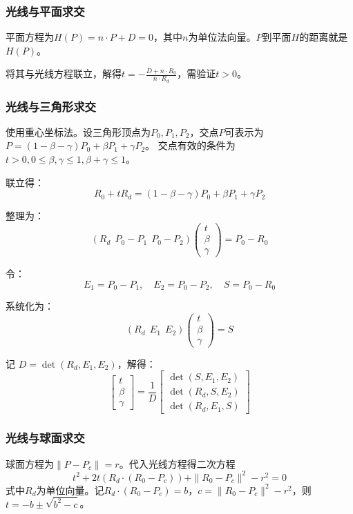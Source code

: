 \documentclass[12pt]{article}
\begin{document}
\subsubsection{光线与平面求交}
平面方程为$H(P) = n \cdot P + D = 0$，其中$n$为单位法向量。$P$到平面$H$的距离就是$H(P)$。 

将其与光线方程联立，解得$t = -\frac{D + n \cdot R_0}{n \cdot R_d}$，需验证$t > 0$。

\subsubsection{光线与三角形求交}
使用重心坐标法。设三角形顶点为$P_0, P_1, P_2$，交点$P$可表示为$P = (1 - \beta - \gamma) P_0 + \beta P_1 + \gamma P_2$。
交点有效的条件为$t > 0, 0 \le \beta, \gamma \le 1, \beta + \gamma \le 1$。

联立得：
\[
R_0 + t R_d = (1-\beta-\gamma)P_0 + \beta P_1 + \gamma P_2
\]

整理为：
\[
(R_d \ \ P_0-P_1 \ \ P_0-P_2)
\begin{pmatrix}
t \\ \beta \\ \gamma
\end{pmatrix}
= P_0 - R_0
\]

令：
\[
E_1 = P_0 - P_1,\quad E_2 = P_0 - P_2,\quad S = P_0 - R_0
\]

系统化为：
\[
(R_d \ \ E_1 \ \ E_2)
\begin{pmatrix}
t \\ \beta \\ \gamma
\end{pmatrix}
= S
\]

记 \( D = \det(R_d, E_1, E_2) \)，解得：
\[
\begin{bmatrix}
t \\ \beta \\ \gamma
\end{bmatrix}
= \frac{1}{D}
\begin{bmatrix}
\det(S, E_1, E_2) \\
\det(R_d, S, E_2) \\
\det(R_d, E_1, S)
\end{bmatrix}
\]

\subsubsection{光线与球面求交}
球面方程为$\| P - P_c \| = r$。代入光线方程得二次方程$$t^2 + 2t (R_d \cdot (R_0 - P_c)) + \| R_0 - P_c \|^2 - r^2 = 0$$
式中$R_d$为单位向量。记$R_d \cdot (R_0 - P_c) = b$，$c = \| R_0 - P_c \|^2 - r^2$，则$t = -b \pm \sqrt {b^2 - c}$。
\end{document}
